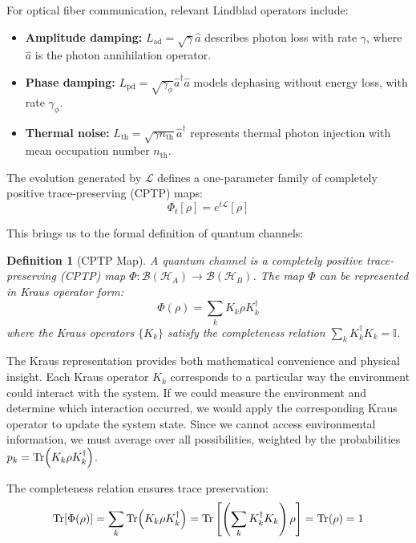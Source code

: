 \documentclass[12pt,a4paper]{article}
\newtheorem{definition}[theorem]{Definition}
\newcommand{\cH}{\mathcal{H}}
\newcommand{\cB}{\mathcal{B}}
\begin{document}
For optical fiber communication, relevant Lindblad operators include:
\begin{itemize}
\item \textbf{Amplitude damping:} $L_{\text{ad}} = \sqrt{\gamma} \hat{a}$ describes photon loss with rate $\gamma$, where $\hat{a}$ is the photon annihilation operator.
\item \textbf{Phase damping:} $L_{\text{pd}} = \sqrt{\gamma_\phi} \hat{a}^\dagger \hat{a}$ models dephasing without energy loss, with rate $\gamma_\phi$.
\item \textbf{Thermal noise:} $L_{\text{th}} = \sqrt{\gamma n_{\text{th}}} \hat{a}^\dagger$ represents thermal photon injection with mean occupation number $n_{\text{th}}$.
\end{itemize}

The evolution generated by $\mathcal{L}$ defines a one-parameter family of completely positive trace-preserving (CPTP) maps:
\begin{equation}
\Phi_t[\rho] = e^{t\mathcal{L}}[\rho]
\end{equation}

This brings us to the formal definition of quantum channels:

\begin{definition}[CPTP Map]
A quantum channel is a completely positive trace-preserving (CPTP) map $\Phi: \cB(\cH_A) \to \cB(\cH_B)$. The map $\Phi$ can be represented in Kraus operator form:
\begin{equation}
\Phi(\rho) = \sum_{k} K_k \rho K_k^\dagger
\end{equation}
where the Kraus operators $\{K_k\}$ satisfy the completeness relation $\sum_k K_k^\dagger K_k = \mathbb{I}$.
\end{definition}

The Kraus representation provides both mathematical convenience and physical insight. Each Kraus operator $K_k$ corresponds to a particular way the environment could interact with the system. If we could measure the environment and determine which interaction occurred, we would apply the corresponding Kraus operator to update the system state. Since we cannot access environmental information, we must average over all possibilities, weighted by the probabilities $p_k = \Tr(K_k \rho K_k^\dagger)$.

The completeness relation ensures trace preservation: 
\begin{equation}
\Tr[\Phi(\rho)] = \sum_k \Tr(K_k \rho K_k^\dagger) = \Tr\left[\left(\sum_k K_k^\dagger K_k\right)\rho\right] = \Tr(\rho) = 1
\end{equation}
\end{document}
